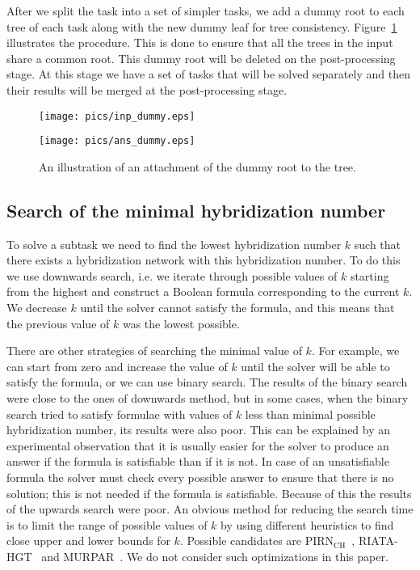 \documentclass[runningheads, envcountsame, a4paper]{llncs}
\begin{document}
After we split the task into a set of simpler tasks, we add a dummy root to each tree of each task along with 
the new dummy leaf for tree consistency. Figure~\ref{dummy-example} illustrates the procedure. 
This is done to ensure that all the trees in the input share a common root. 
This dummy root will be deleted on the post-processing stage. At this stage we have a set of tasks that will be solved 
separately and then their results will be merged at the post-processing stage.

\begin{figure}[t]
  \centering
  \begin{minipage}[b]{0.39\linewidth}
    \texttt{[image: pics/inp\_dummy.eps]}
  \end{minipage}
  \hfill
  \begin{minipage}[b]{0.59\linewidth}
    \texttt{[image: pics/ans\_dummy.eps]}
  \end{minipage}
  \caption{An illustration of an attachment of the dummy root to the tree.}
  \label{dummy-example}
\end{figure}

\subsection{Search of the minimal hybridization number}

To solve a subtask we need to find the lowest hybridization number $k$ such that there exists a hybridization 
network with this hybridization number. To do this we use downwards search, i.e. we iterate through possible values of $k$ starting from the highest 
and construct a Boolean formula corresponding to the current $k$. 
We decrease $k$ until the solver cannot satisfy the formula, and this means that the previous value of $k$ was the 
lowest possible.

There are other strategies of searching the minimal value of $k$. For example, we can start from 
zero and increase the value of $k$ until the solver will be able to satisfy the formula, or we can use binary search. 
The results of the binary search were close to the ones of downwards method, 
but in some cases, when the binary search tried to satisfy formulae with values of $k$ less than minimal possible hybridization number, 
its results were also poor. 
This can be explained by an experimental observation that it is usually easier for the solver to produce an answer if the formula is satisfiable than if it is not. 
In case of an unsatisfiable formula the solver must check every possible answer to ensure that there is no solution; this is not needed if the 
formula is satisfiable. Because of this the results of the upwards search were poor. An obvious method 
for reducing the search time is to limit the range of possible values of $k$ by using different heuristics to find close upper and lower bounds for $k$. 
Possible candidates are PIRN$\mathrm{_{CH}}$~\cite{wu2013algorithm}, RIATA-HGT~\cite{nakhleh2005riata} and MURPAR~\cite{park2012murpar}. We do not consider such optimizations in this paper.
\end{document}
